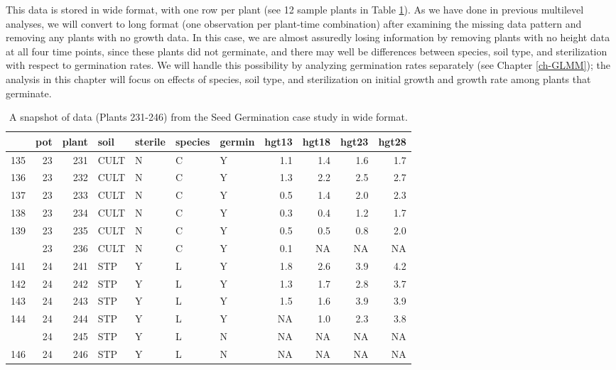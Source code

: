 \documentclass[
]{krantz}
\begin{document}
This data is stored in wide format, with one row per plant (see 12 sample plants in Table \ref{tab:table1chp10}). As we have done in previous multilevel analyses, we will convert to long format (one observation per plant-time combination) after examining the missing data pattern and removing any plants with no growth data. In this case, we are almost assuredly losing information by removing plants with no height data at all four time points, since these plants did not germinate, and there may well be differences between species, soil type, and sterilization with respect to germination rates. We will handle this possibility by analyzing germination rates separately (see Chapter \ref{ch-GLMM}); the analysis in this chapter will focus on effects of species, soil type, and sterilization on initial growth and growth rate among plants that germinate.

\begin{table}[t]

\caption{\label{tab:table1chp10}A snapshot of data (Plants 231-246) from the Seed Germination case study in wide format.}
\centering
\begin{tabular}{lrrllllrrrr}
\toprule
  & pot & plant & soil & sterile & species & germin & hgt13 & hgt18 & hgt23 & hgt28\\
\midrule
135 & 23 & 231 & CULT & N & C & Y & 1.1 & 1.4 & 1.6 & 1.7\\
136 & 23 & 232 & CULT & N & C & Y & 1.3 & 2.2 & 2.5 & 2.7\\
137 & 23 & 233 & CULT & N & C & Y & 0.5 & 1.4 & 2.0 & 2.3\\
138 & 23 & 234 & CULT & N & C & Y & 0.3 & 0.4 & 1.2 & 1.7\\
139 & 23 & 235 & CULT & N & C & Y & 0.5 & 0.5 & 0.8 & 2.0\\
\addlinespace
140 & 23 & 236 & CULT & N & C & Y & 0.1 & NA & NA & NA\\
141 & 24 & 241 & STP & Y & L & Y & 1.8 & 2.6 & 3.9 & 4.2\\
142 & 24 & 242 & STP & Y & L & Y & 1.3 & 1.7 & 2.8 & 3.7\\
143 & 24 & 243 & STP & Y & L & Y & 1.5 & 1.6 & 3.9 & 3.9\\
144 & 24 & 244 & STP & Y & L & Y & NA & 1.0 & 2.3 & 3.8\\
\addlinespace
145 & 24 & 245 & STP & Y & L & N & NA & NA & NA & NA\\
146 & 24 & 246 & STP & Y & L & N & NA & NA & NA & NA\\
\bottomrule
\end{tabular}
\end{table}
\end{document}
